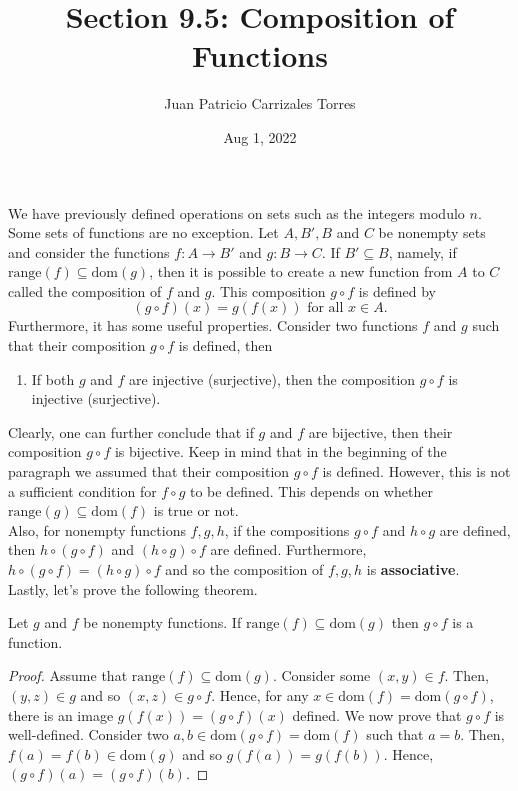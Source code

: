 \documentclass[12pt]{article}
\newcommand{\Dom}[1]{\mathrm{dom}(#1)}
\newcommand{\Range}[1]{\mathrm{range}(#1)}
\newenvironment{theorem}[2][Theorem]{\begin{trivlist} \item[\hskip \labelsep {\bfseries #1}\hskip \labelsep {\bfseries #2.}]}{\end{trivlist}}
\begin{document}
  
 \title{Section 9.5: Composition of Functions}
   \author{Juan Patricio Carrizales Torres}
     \date{Aug 1, 2022}
       \maketitle
   
       We have previously defined operations on sets such as the integers modulo $n$. Some sets of functions are no exception. Let $A,B',B$ and $C$ be nonempty sets and consider the functions $f:A\to B'$ and $g:B\to C$. If $B' \subseteq B$, namely, if $\Range{f} \subseteq \Dom{g}$, then it is possible to create a new function from $A$ to $C$ called the composition of $f$ and $g$. This composition $g\circ f$ is defined by
    \begin{equation*}
   ( g\circ f)(x) = g(f(x)) \text{ for all } x\in A.
    \end{equation*}
    Furthermore, it has some useful properties. Consider two functions $f$ and $g$ such that their composition $g\circ f$ is defined, then 
    \begin{enumerate}
      \item If both $g$ and $f$ are injective (surjective), then the composition $g\circ f$ is injective (surjective).
    \end{enumerate}
    Clearly, one can further conclude that if $g$ and $f$ are bijective, then their composition $g\circ f$ is bijective. Keep in mind that in the beginning of the paragraph we assumed that their composition $g\circ f$ is defined. However, this is not a sufficient condition for $f\circ g$ to be defined. This depends on whether $\Range{g} \subseteq \Dom{f}$ is true or not. \\

    Also, for nonempty functions $f,g,h$, if the compositions $g\circ f$ and $h\circ g$ are defined, then $h\circ (g \circ f)$ and $(h\circ g)\circ f$ are defined. Furthermore, $h\circ(g\circ f) = (h\circ g)\circ f$ and so the composition of $f,g,h$ is \textbf{associative}. \\
    Lastly, let's prove the following theorem.
    \begin{theorem}{9.5.1}
      Let $g$ and $f$ be nonempty functions. If $\Range{f}\subseteq \Dom{g}$ then  $g\circ f$ is a function.
    \begin{proof}
      Assume that $\Range{f}\subseteq \Dom{g}$. Consider some $(x,y)\in f$. Then, $(y,z)\in g$ and so $(x,z)\in g\circ f$. Hence, for any $x\in \Dom{f}=\Dom{g\circ f}$, there is an image $g(f(x)) = (g\circ f)(x)$ defined. We now prove that $g\circ f$ is well-defined. Consider two $a,b\in \Dom{g\circ f} = \Dom{f}$ such that $a=b$. Then, $f(a)=f(b)\in \Dom{g}$ and so $g(f(a))=g(f(b))$. Hence, $(g\circ f)(a)=(g\circ f)(b)$.
    \end{proof}
    \end{theorem}
       
\end{document}
